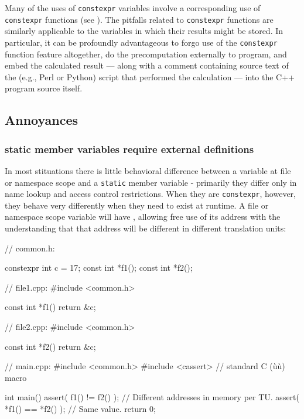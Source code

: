 Many of the uses of \lstinline!constexpr! variables involve a corresponding
use of \lstinline!constexpr! functions (see ). The pitfalls related to \lstinline!constexpr! functions are
similarly applicable to the variables in which their results might be
stored. In particular, it can be profoundly advantageous to forgo use of
the \lstinline!constexpr! function feature altogether, do the
precomputation externally to program, and embed the calculated result
--- along with a comment containing source text of the (e.g., Perl or
Python) script that performed the calculation --- into the C++ program
source itself.

\subsection[Annoyances]{Annoyances}\label{annoyances}

\subsubsection[\lstinline!static! member variables require external definitions]{{\SubsubsecCode static} member variables require external definitions}

In most stituations there is little behavioral difference between a variable at file or namespace scope and a
\lstinline!static! member variable - primarily they differ only in name lookup and access control restrictions.
When they are \lstinline!constexpr!, however, they behave very differently when they need to exist
at runtime.  A file or namespace scope variable will have , allowing free use
of its address with the understanding that that address will be different in different translation units:

\begin{emcppslisting}
// common.h:

constexpr int c = 17;
const int *f1();
const int *f2();

// file1.cpp:
#include <common.h>

const int *f1() { return &c; }

// file2.cpp:
#include <common.h>

const int *f2() { return &c; }

// main.cpp:
#include <common.h>
#include <cassert>  // standard C (ù{}ù) macro

int main()
{
    assert( f1() != f2() );    // Different addresses in memory per TU.
    assert( *f1() == *f2() );  // Same value.
    return 0;
}
\end{emcppslisting}

